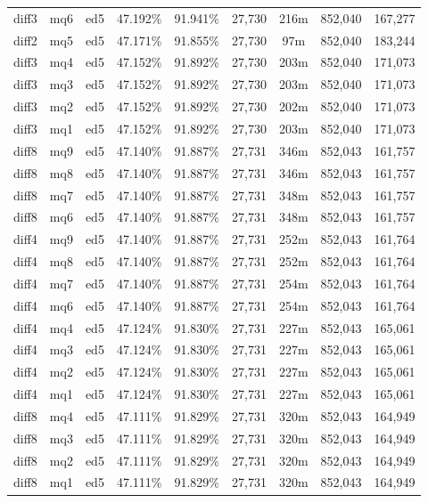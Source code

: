 \begin{landscape}
\begin{longtable}{|c|c|c||c|c||c|c|c|c|}
diff3 & mq6 & ed5 & 47.192\% & 91.941\% & 27,730 & 216m & 852,040 & 167,277 \\
diff2 & mq5 & ed5 & 47.171\% & 91.855\% & 27,730 & 97m & 852,040 & 183,244 \\
diff3 & mq4 & ed5 & 47.152\% & 91.892\% & 27,730 & 203m & 852,040 & 171,073 \\
diff3 & mq3 & ed5 & 47.152\% & 91.892\% & 27,730 & 203m & 852,040 & 171,073 \\
diff3 & mq2 & ed5 & 47.152\% & 91.892\% & 27,730 & 202m & 852,040 & 171,073 \\
diff3 & mq1 & ed5 & 47.152\% & 91.892\% & 27,730 & 203m & 852,040 & 171,073 \\
diff8 & mq9 & ed5 & 47.140\% & 91.887\% & 27,731 & 346m & 852,043 & 161,757 \\
diff8 & mq8 & ed5 & 47.140\% & 91.887\% & 27,731 & 346m & 852,043 & 161,757 \\
diff8 & mq7 & ed5 & 47.140\% & 91.887\% & 27,731 & 348m & 852,043 & 161,757 \\
diff8 & mq6 & ed5 & 47.140\% & 91.887\% & 27,731 & 348m & 852,043 & 161,757 \\
diff4 & mq9 & ed5 & 47.140\% & 91.887\% & 27,731 & 252m & 852,043 & 161,764 \\
diff4 & mq8 & ed5 & 47.140\% & 91.887\% & 27,731 & 252m & 852,043 & 161,764 \\
diff4 & mq7 & ed5 & 47.140\% & 91.887\% & 27,731 & 254m & 852,043 & 161,764 \\
diff4 & mq6 & ed5 & 47.140\% & 91.887\% & 27,731 & 254m & 852,043 & 161,764 \\
diff4 & mq4 & ed5 & 47.124\% & 91.830\% & 27,731 & 227m & 852,043 & 165,061 \\
diff4 & mq3 & ed5 & 47.124\% & 91.830\% & 27,731 & 227m & 852,043 & 165,061 \\
diff4 & mq2 & ed5 & 47.124\% & 91.830\% & 27,731 & 227m & 852,043 & 165,061 \\
diff4 & mq1 & ed5 & 47.124\% & 91.830\% & 27,731 & 227m & 852,043 & 165,061 \\
diff8 & mq4 & ed5 & 47.111\% & 91.829\% & 27,731 & 320m & 852,043 & 164,949 \\
diff8 & mq3 & ed5 & 47.111\% & 91.829\% & 27,731 & 320m & 852,043 & 164,949 \\
diff8 & mq2 & ed5 & 47.111\% & 91.829\% & 27,731 & 320m & 852,043 & 164,949 \\
diff8 & mq1 & ed5 & 47.111\% & 91.829\% & 27,731 & 320m & 852,043 & 164,949 \\

\end{longtable}
\end{landscape}

